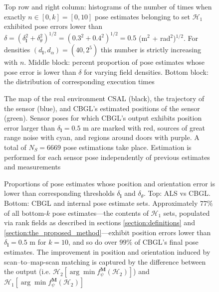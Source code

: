 \begin{figure}
  \vspace{-0.3cm}
  
  \vspace{-0.3cm}
  \caption{\small Top row and right column: histograms of the number of times
           when exactly $n \in [0,k] = [0,10]$ pose estimates belonging to set
           $\mathcal{H}_1$ exhibited pose errors lower than $\delta =
           (\delta_{\bm{l}}^2 + \delta_{\theta}^2)^{1/2} =  (0.3^2 +
           0.4^2)^{1/2} = 0.5$ (m$^2$ + rad$^2$)$^{1/2}$. For densities
           $(d_{\bm{l}},d_{\alpha}) = (40, 2^5)$ this number is strictly
           increasing with $n$. Middle block: percent proportion of pose
           estimates whose pose error is lower than $\delta$ for varying field
           densities. Bottom block: the distribution of corresponding execution
           times}
  \vspace{-0.5cm}
  \label{fig:a:determine_40_32}
\end{figure}


\begin{figure}
  
  \vspace{-0.7cm}
  \caption{\small The map of the real environment CSAL (black), the trajectory
           of the sensor (blue), and CBGL's estimated positions of the sensor
           (green). Sensor poses for which CBGL's output exhibits position
           error larger than $\delta_{\bm{l}} = 0.5$ m are marked with red,
           sources of great range noise with cyan, and regions around doors
           with purple. A total of $N_S = 6669$ pose estimations take place.
           Estimation is performed for each sensor pose independently of
           previous estimates and measurements}
  \vspace{-0.5cm}
  \label{fig:a:map_and_trajectory}
\end{figure}

\begin{figure}
  \vspace{-0.4cm}
  
  \vspace{0.01cm}
  \caption{\small Proportions of pose estimates whose position and orientation
           error is lower than corresponding thresholds $\delta_{\bm{l}}$ and
           $\delta_{\theta}$. Top: ALS vs CBGL. Bottom: CBGL and internal pose
           estimate sets.  Approximately $77\%$ of all bottom-$k$ pose
           estimates---the contents of $\mathcal{H}_1$ sets, populated via rank
           fields as described in sections \ref{section:definitions} and
           \ref{section:the_proposed_method}---exhibit position errors lower
           than $\delta_{\bm{l}} = 0.5$ m for $k=10$, and so do over $99\%$ of
           CBGL's final pose estimates. The improvement in position and
           orientation induced by scan--to--map-scan matching is captured by
           the difference between the output (i.e.  $\mathcal{H}_2[\arg \min
           f_{\psi}^{\bm{M}}(\mathcal{H}_2)]$) and $\mathcal{H}_1[\arg \min
           f_{\psi}^{\bm{M}}(\mathcal{H}_2)]$}
  \vspace{-0.5cm}
  \label{fig:a:awesomeness}
\end{figure}


